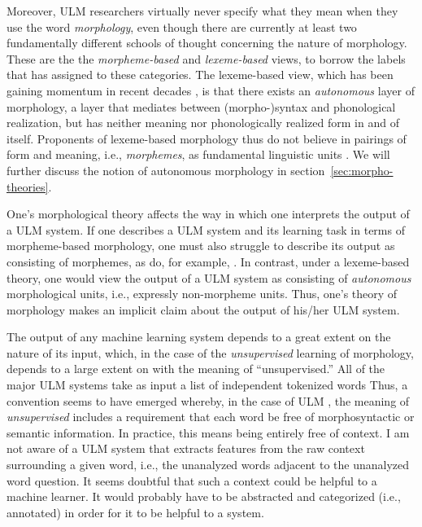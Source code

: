 Moreover, ULM researchers virtually never specify what they mean
when they use the word \emph{morphology}, even though there
are currently at least two fundamentally different schools of thought concerning the nature of morphology. These are the 
the \emph{morpheme-based} and \emph{lexeme-based} views, to borrow the labels that \cite{aronoff:1994} has assigned 
to these categories. The lexeme-based view, which has been gaining momentum in recent decades \citep{anderson:2017},
is that there exists an \emph{autonomous} layer of morphology, a layer that mediates between (morpho-)syntax
and phonological realization, but has neither meaning nor phonologically realized form in and of itself. Proponents
of lexeme-based morphology thus do not believe in pairings of form and meaning, i.e., \emph{morphemes}, as fundamental linguistic
units \citep{anderson:2015}. We will further discuss the notion of autonomous morphology in section~\ref{sec:morpho-theories}.

One's morphological theory affects the way in which one interprets the output of a ULM  system. 
If one describes a ULM  system and its learning task in terms of 
morpheme-based morphology, one must also struggle to 
describe its output as consisting of morphemes, as do, for example, 
\cite{creutz-and-lagus:2007,creutz-and-lagus:2005}. In contrast, under a 
lexeme-based theory, one would view the output of a ULM  system as 
consisting of \emph{autonomous} morphological units, i.e., 
expressly non-morpheme units. 
Thus, one's theory of morphology makes an implicit claim about the output of 
his/her ULM  system.

The output of any machine learning system depends to 
a great extent on the nature of its input, which, in the case of the 
\emph{unsupervised} learning of morphology, 
depends to a large extent on with the meaning of ``unsupervised.'' 
All of the major ULM  
systems take as input a list of independent tokenized words 
\citep[e.g.,][]{goldsmith:2001,baroni-et-al:2002,creutz-and-lagus:2005,poon-et-al:2009}
Thus, a convention seems to have emerged whereby, in the 
case of ULM , the meaning of \emph{unsupervised} includes a
requirement that each word be free of morphosyntactic 
or semantic information. In practice,
this means being entirely free of context. I am 
not aware of a ULM system that extracts features from the raw context surrounding a given word, i.e.,
the unanalyzed words adjacent to the unanalyzed word question. It seems doubtful
that such a context could be helpful to a machine learner. 
It would probably have to be abstracted and categorized 
(i.e., annotated) in order
for it to be helpful to a system.

